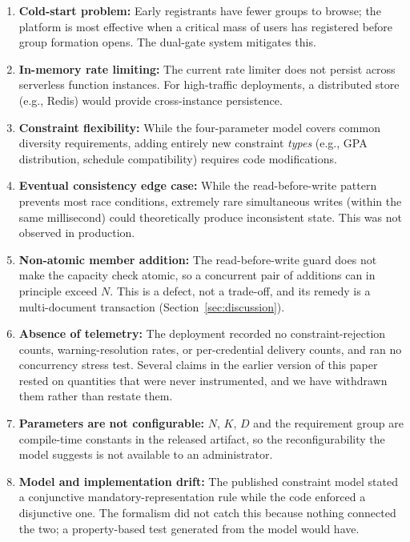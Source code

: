 \documentclass[11pt,a4paper]{article}
\theoremstyle{plain}
\theoremstyle{definition}
\theoremstyle{remark}
\begin{document}
\begin{enumerate}[noitemsep,topsep=4pt]
    \item \textbf{Cold-start problem:} Early registrants have fewer groups to browse; the platform is most effective when a critical mass of users has registered before group formation opens. The dual-gate system mitigates this.

    \item \textbf{In-memory rate limiting:} The current rate limiter does not persist across serverless function instances. For high-traffic deployments, a distributed store (e.g., Redis) would provide cross-instance persistence.

    \item \textbf{Constraint flexibility:} While the four-parameter model covers common diversity requirements, adding entirely new constraint \emph{types} (e.g., GPA distribution, schedule compatibility) requires code modifications.

    \item \textbf{Eventual consistency edge case:} While the read-before-write pattern prevents most race conditions, extremely rare simultaneous writes (within the same millisecond) could theoretically produce inconsistent state. This was not observed in production.

    \item \textbf{Non-atomic member addition:} The read-before-write guard does not make the capacity check atomic, so a concurrent pair of additions can in principle exceed $N$. This is a defect, not a trade-off, and its remedy is a multi-document transaction (Section~\ref{sec:discussion}).

    \item \textbf{Absence of telemetry:} The deployment recorded no constraint-rejection counts, warning-resolution rates, or per-credential delivery counts, and ran no concurrency stress test. Several claims in the earlier version of this paper rested on quantities that were never instrumented, and we have withdrawn them rather than restate them.

    \item \textbf{Parameters are not configurable:} $N$, $K$, $D$ and the requirement group are compile-time constants in the released artifact, so the reconfigurability the model suggests is not available to an administrator.

    \item \textbf{Model and implementation drift:} The published constraint model stated a conjunctive mandatory-representation rule while the code enforced a disjunctive one. The formalism did not catch this because nothing connected the two; a property-based test generated from the model would have.


\end{enumerate}
\end{document}

